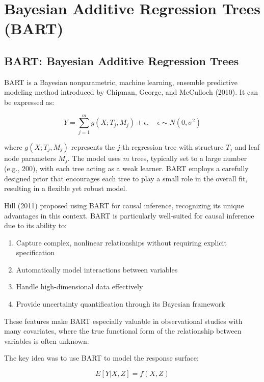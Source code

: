 \documentclass[
  letterpaper,
  DIV=11,
  numbers=noendperiod]{scrreprt}
\providecommand{\tightlist}{%
  \setlength{\itemsep}{0pt}\setlength{\parskip}{0pt}}\usepackage{longtable,booktabs,array}
\begin{document}
\chapter{Bayesian Additive Regression Trees
(BART)}\label{bayesian-additive-regression-trees-bart}

\section{BART: Bayesian Additive Regression
Trees}\label{bart-bayesian-additive-regression-trees}

BART is a Bayesian nonparametric, machine learning, ensemble predictive
modeling method introduced by Chipman, George, and McCulloch (2010). It
can be expressed as:

\[
Y = \sum_{j=1}^m g(X; T_j, M_j) + \epsilon, \quad \epsilon \sim N(0, \sigma^2)
\]

where \(g(X; T_j, M_j)\) represents the \(j\)-th regression tree with
structure \(T_j\) and leaf node parameters \(M_j\). The model uses \(m\)
trees, typically set to a large number (e.g., 200), with each tree
acting as a weak learner. BART employs a carefully designed prior that
encourages each tree to play a small role in the overall fit, resulting
in a flexible yet robust model.

Hill (2011) proposed using BART for causal inference, recognizing its
unique advantages in this context. BART is particularly well-suited for
causal inference due to its ability to:

\begin{enumerate}
\def\labelenumi{\arabic{enumi}.}
\tightlist
\item
  Capture complex, nonlinear relationships without requiring explicit
  specification
\item
  Automatically model interactions between variables
\item
  Handle high-dimensional data effectively
\item
  Provide uncertainty quantification through its Bayesian framework
\end{enumerate}

These features make BART especially valuable in observational studies
with many covariates, where the true functional form of the relationship
between variables is often unknown.

The key idea was to use BART to model the response surface:

\[
E[Y | X, Z] = f(X, Z)
\]
\end{document}
